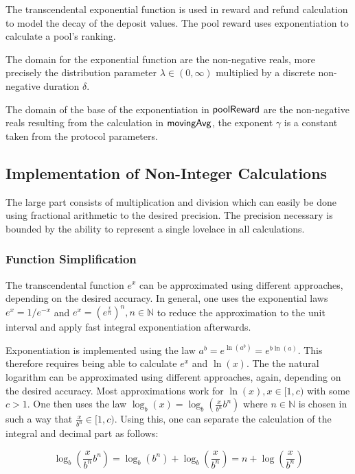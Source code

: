 The transcendental exponential function is used in reward and refund calculation
to model the decay of the deposit values. The pool reward uses exponentiation to
calculate a pool's ranking.

The domain for the exponential function are the non-negative reals, more
precisely the distribution parameter $\lambda \in (0, \infty)$ multiplied by a
discrete non-negative duration $\delta$.

The domain of the base of the exponentiation in $\mathsf{poolReward}$ are the
non-negative reals resulting from the calculation in $\mathsf{movingAvg}$, the
exponent $\gamma$ is a constant taken from the protocol parameters.

\subsection{Implementation of Non-Integer Calculations}
\label{sec:impl-non-integ}

The large part consists of multiplication and division which can easily be done
using fractional arithmetic to the desired precision. The precision necessary is
bounded by the ability to represent a single lovelace in all calculations.

\subsubsection{Function Simplification}
\label{sec:funct-simpl}

The transcendental function $e^{x}$ can be approximated using different
approaches, depending on the desired accuracy. In general, one uses the
exponential laws $e^{x} = 1/e^{-x}$ and
$e^{x} = \left(e^{\frac{x}{n}} \right)^{n}, n \in \mathbb{N}$ to reduce the
approximation to the unit interval and apply fast integral exponentiation
afterwards.

Exponentiation is implemented using the law
$a^{b} = e^{\ln(a^{b})}= e^{b\ln(a)}$. This therefore requires being able to
calculate $e^{x}$ and $\ln(x)$. The the natural logarithm can
be approximated using different approaches, again, depending on the desired
accuracy. Most approximations work for $\ln(x), x \in [1, c)$ with some $c >
1$. One then uses the law $\log_{b}(x) = \log_{b}(\frac{x}{b^{n}}b^{n})$ where
$n \in \mathbb{N}$ is chosen in such a way that $\frac{x}{b^{n}} \in [1,
c)$. Using this, one can separate the calculation of the integral and decimal
part as follows:

\begin{equation*}
  \log_{b}(\frac{x}{b^{n}}b^{n})=\log_{b}(b^{n}) + \log_{b}(\frac{x}{b^{n}})=
  n + \log(\frac{x}{b^{n}})
\end{equation*}

